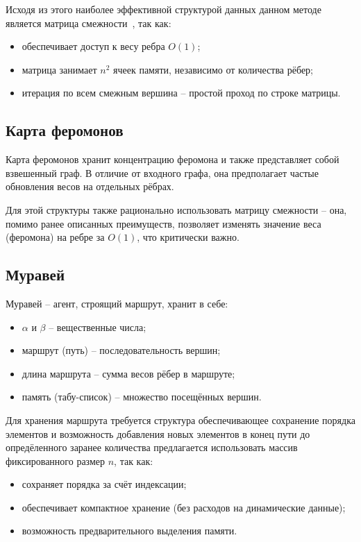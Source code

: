 Исходя из этого наиболее эффективной структурой данных данном методе является матрица смежности~\cite{algos}, так как:

\begin{itemize}
	\item обеспечивает доступ к весу ребра $O(1)$;
	\item матрица занимает $n^2$ ячеек памяти, независимо от количества рёбер;
	\item итерация по всем смежным вершина -- простой проход по строке матрицы.
\end{itemize}

\subsection{Карта феромонов}

Карта феромонов хранит концентрацию феромона и также представляет собой взвешенный граф. В отличие от входного графа, она предполагает частые обновления весов на отдельных рёбрах.

Для этой структуры также рационально использовать матрицу смежности -- она, помимо ранее описанных преимуществ, позволяет изменять значение веса (феромона) на ребре за $O(1)$, что критически важно.

\subsection{Муравей}

Муравей -- агент, строящий маршрут, хранит в себе:

\begin{itemize}
	\item $\alpha$ и $\beta$ -- вещественные числа;
	\item маршрут (путь) -- последовательность вершин;
	\item длина маршрута -- сумма весов рёбер в маршруте;
	\item память (табу-список) -- множество посещённых вершин.
\end{itemize}


Для хранения маршрута требуется структура обеспечивающее сохранение порядка элементов и возможность добавления новых элементов в конец пути до опредёленного заранее количества предлагается использовать массив фиксированного размер $n$, так как:

\begin{itemize}
	\item сохраняет порядка за счёт индексации;
	\item обеспечивает компактное хранение (без расходов на динамические данные);
	\item возможность предварительного выделения памяти.
\end{itemize}

